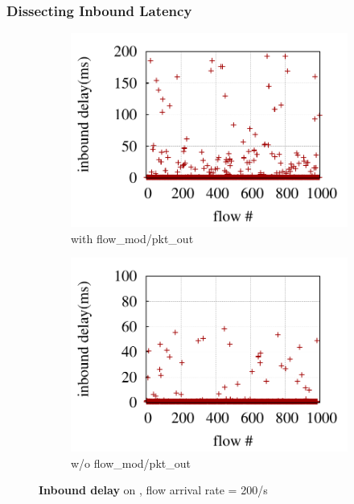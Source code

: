 \subsubsection{Dissecting Inbound Latency}
\label{mazu-measure_inbound}

\begin{figure}
	\centering
	\begin{subfigure}[b]{0.40\textwidth}
	\centering
	\includegraphics[width=\textwidth]{./figures/mazu/jan27_intel_inbound_with_pktout_flowmod_rate200-eps-converted-to.pdf}
	\caption{with flow\_mod/pkt\_out}
	\label{fig:intel_inbound_test3}
	\end{subfigure}
	\centering
        \begin{subfigure}[b]{0.40\textwidth}
        \centering
	\includegraphics[width=\textwidth]{./figures/mazu/jan27_intel_inbound_wo_pktout_flowmod-eps-converted-to.pdf}
	\caption{w/o flow\_mod/pkt\_out}
	\label{fig:intel_inbound_test3_wo}
	\end{subfigure}	
	\caption{{\bf Inbound delay} on {\bf \Intel}, flow arrival rate = 200/s} 
	\label{fig:inbound-1}
\end{figure}

